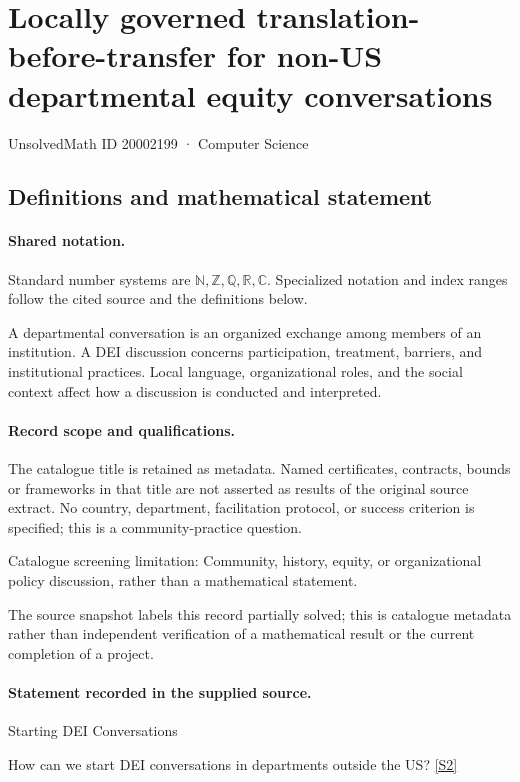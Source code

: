 \documentclass[11pt]{article}
\newcommand{\sref}[2]{\hyperlink{source:#1:#2}{[S#2]}}
\begin{document}
\setcounter{section}{20002198}
\section{Locally governed translation-before-transfer for non-US departmental equity conversations}\label{20002199}
{\small\sffamily UnsolvedMath ID 20002199 · Computer Science}
\subsection{Definitions and mathematical statement}

\paragraph{Shared notation.}Standard number systems are $\mathbb N,\mathbb Z,\mathbb Q,\mathbb R,\mathbb C$. Specialized notation and index ranges follow the cited source and the definitions below.


A departmental conversation is an organized exchange among members of an institution. A DEI discussion concerns participation, treatment, barriers, and institutional practices. Local language, organizational roles, and the social context affect how a discussion is conducted and interpreted.
\paragraph{Record scope and qualifications.}
The catalogue title is retained as metadata. Named certificates, contracts, bounds or frameworks in that title are not asserted as results of the original source extract.
No country, department, facilitation protocol, or success criterion is specified; this is a community-practice question.

Catalogue screening limitation: Community, history, equity, or organizational policy discussion, rather than a mathematical statement.

The source snapshot labels this record partially solved; this is catalogue metadata rather than independent verification of a mathematical result or the current completion of a project.
\paragraph{Statement recorded in the supplied source.}
Starting DEI Conversations

How can we start DEI conversations in departments outside the US? \sref{20002199}{2}
\end{document}
